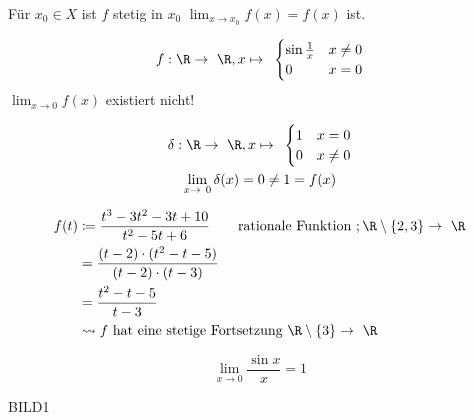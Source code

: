 \begin{fakt}
	Für $x_0 \in X$ ist $f$ stetig in $x_0$ \gdw $\lim_{x \rightarrow x_0} f(x) = f(x)$ ist.
\end{fakt}
\begin{bsp*}
	\[ f: \R \rightarrow \R , x \mapsto \begin{cases}
		\sin \frac{1}{x}	&x \neq 0	\\
		0			&x = 0	
	\end{cases} \]
	$\lim_{x \rightarrow 0} f(x)$ existiert nicht!
\end{bsp*}
\begin{bsp*}
	\begin{gather*}
		\delta : \R \rightarrow \R , x \mapsto \begin{cases}
			1	&x = 0	\\
			0	&x \neq 0	
		\end{cases} \\
		\lim_{x \rightarrow 0} \delta(x) = 0 \neq 1 = f(x)
	\end{gather*}
\end{bsp*}
\begin{bsp*}
	\[ \begin{split}
		f(t)	&\coloneqq \frac{t^3 - 3t^2 -3t + 10}{t^2 - 5t + 6} \qquad \text{rationale Funktion } ; \R \setminus \{ 2,3 \} \rightarrow \R \\
			&= \frac{(t-2) \cdot (t^2 - t -5)}{(t-2) \cdot (t-3)} \\
			&= \frac{t^2 - t - 5}{t-3} \\
			&\rightsquigarrow f \text{ hat eine stetige Fortsetzung } \R \setminus \{ 3 \} \rightarrow \R
	\end{split} \]
\end{bsp*}
\begin{bsp*}
	\[ \lim_{x \rightarrow 0} \frac{\sin x}{x} = 1 \]
	\begin{bew}[head = Geometrische Beweisidee:]
		BILD1
	\end{bew}
\end{bsp*}

